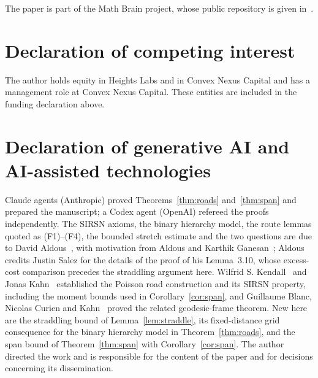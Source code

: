 \documentclass[11pt]{amsart}
\theoremstyle{remark}
\begin{document}
The paper is part of the Math Brain project, whose public repository is given in~\cite{MathBrainRepo}.

\section*{Declaration of competing interest}
The author holds equity in Heights Labs and in Convex Nexus Capital and has a management role at Convex Nexus Capital.
These entities are included in the funding declaration above.

\section*{Declaration of generative AI and AI-assisted technologies}
Claude agents (Anthropic) proved Theorems~\ref{thm:roads} and~\ref{thm:span} and prepared the manuscript; a Codex agent
(OpenAI) refereed the proofs independently. The SIRSN axioms, the binary hierarchy model, the route lemmas quoted as
(F1)--(F4), the bounded stretch estimate and the two questions are due to David Aldous~\cite{A14}, with motivation from
Aldous and Karthik Ganesan~\cite{AG13}; Aldous credits Justin Salez for the details of the proof of his Lemma~3.10,
whose excess-cost comparison precedes the straddling argument here. Wilfrid S. Kendall~\cite{K17} and Jonas
Kahn~\cite{Kahn16} established the Poisson road construction and its SIRSN property, including the moment bounds used
in Corollary~\ref{cor:span}, and Guillaume Blanc, Nicolas Curien and Kahn~\cite{BCK25} proved the related
geodesic-frame theorem. New here are the straddling bound of Lemma~\ref{lem:straddle}, its fixed-distance grid
consequence for the binary hierarchy model in Theorem~\ref{thm:roads}, and the span bound of Theorem~\ref{thm:span}
with Corollary~\ref{cor:span}. The author directed the work and is responsible for the content of the paper and for
decisions concerning its dissemination.
\end{document}
